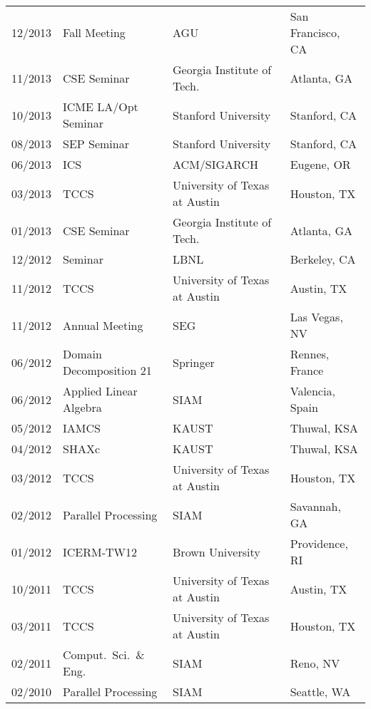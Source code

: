 \documentclass[letterpaper]{article}
\begin{document}
\begin{tabular}{rlll}
12/2013 & Fall Meeting                    & AGU                           & San Francisco, CA \\
11/2013 & CSE Seminar                     & Georgia Institute of Tech.\   & Atlanta, GA \\
10/2013 & ICME LA/Opt Seminar             & Stanford University           & Stanford, CA \\
08/2013 & SEP Seminar                     & Stanford University           & Stanford, CA \\
06/2013 & ICS                             & ACM/SIGARCH                   & Eugene, OR \\
03/2013 & TCCS                            & University of Texas at Austin & Houston, TX \\
01/2013 & CSE Seminar                     & Georgia Institute of Tech.\   &  Atlanta, GA \\
12/2012 & Seminar                         & LBNL                          &  Berkeley, CA \\
11/2012 & TCCS                            & University of Texas at Austin & Austin, TX \\
11/2012 & Annual Meeting                  & SEG                           & Las Vegas, NV \\
06/2012 & Domain Decomposition 21         & Springer                      & Rennes, France \\
06/2012 & Applied Linear Algebra          & SIAM                          & Valencia, Spain \\
05/2012 & IAMCS                           & KAUST                         & Thuwal, KSA \\
04/2012 & SHAXc                           & KAUST                         & Thuwal, KSA \\
03/2012 & TCCS                            & University of Texas at Austin & Houston, TX \\
02/2012 & Parallel Processing             & SIAM                          & Savannah, GA \\
01/2012 & ICERM-TW12                      & Brown University              & Providence, RI \\
10/2011 & TCCS                            & University of Texas at Austin & Austin, TX \\
03/2011 & TCCS                            & University of Texas at Austin & Houston, TX \\
02/2011 & Comput.\ Sci.\ \& Eng.\         & SIAM                          & Reno, NV \\
02/2010 & Parallel Processing             & SIAM                          & Seattle, WA \\
\end{tabular}
\end{document}
